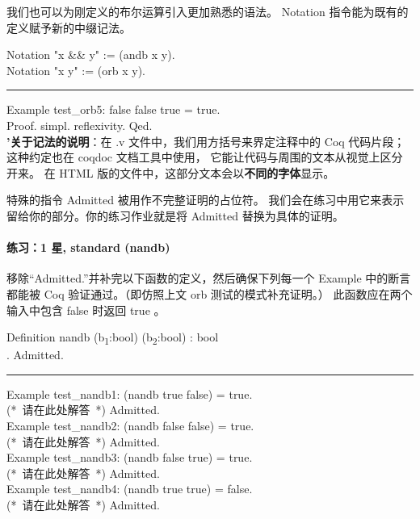 \documentclass[utf8]{ctexart}
\let\oldparagraph\paragraph
\renewcommand{\paragraph}[1]{\oldparagraph{#1}\mbox{}}
\begin{document}
我们也可以为刚定义的布尔运算引入更加熟悉的语法。 {{Notation}}
指令能为既有的定义赋予新的中缀记法。

{Notation} "x \&\& y" := ({andb} {x} {y}).\\
{Notation} "x \textbar\textbar{} y" := ({orb} {x} {y}).\\

\begin{center}\rule{0.5\linewidth}{\linethickness}\end{center}

{Example} {test\_orb5}: {false} \textbar\textbar{} {false}
\textbar\textbar{} {true} = {true}.\\
{Proof}. {simpl}. {reflexivity}. {Qed}.\\

\textbf{'关于记法的说明}：在 {.{v}} 文件中，我们用方括号来界定注释中的
Coq 代码片段；这种约定也在 {{coqdoc}} 文档工具中使用，
它能让代码与周围的文本从视觉上区分开来。 在 HTML
版的文件中，这部分文本会以\textbf{不同的字体}显示。

特殊的指令 {{Admitted}} 被用作不完整证明的占位符。
我们会在练习中用它来表示留给你的部分。你的练习作业就是将 {{Admitted}}
替换为具体的证明。

\protect\hypertarget{lab24}{}{}

\hypertarget{ux7ec3ux4e601-ux661f-standard-nandb}{%
\paragraph{练习：1 星, standard
(nandb)}\label{ux7ec3ux4e601-ux661f-standard-nandb}}

移除``{{Admitted}.}''并补完以下函数的定义，然后确保下列每一个
{{Example}} 中的断言都能被 Coq 验证通过。（即仿照上文 {{orb}}
测试的模式补充证明。） 此函数应在两个输入中包含 {{false}} 时返回
{{true}} 。

{Definition} {nandb} ({b\textsubscript{1}}:{bool})
({b\textsubscript{2}}:{bool}) : {bool}\\
\hspace*{0.333em}\hspace*{0.333em}{(*~将本行替换成~":=~\_你的\_定义\_~."~*)}.
{Admitted}.\\

\begin{center}\rule{0.5\linewidth}{\linethickness}\end{center}

{Example} {test\_nandb1}: ({nandb} {true} {false}) = {true}.\\
{(*~请在此处解答~*)} {Admitted}.\\
{Example} {test\_nandb2}: ({nandb} {false} {false}) = {true}.\\
{(*~请在此处解答~*)} {Admitted}.\\
{Example} {test\_nandb3}: ({nandb} {false} {true}) = {true}.\\
{(*~请在此处解答~*)} {Admitted}.\\
{Example} {test\_nandb4}: ({nandb} {true} {true}) = {false}.\\
{(*~请在此处解答~*)} {Admitted}.\\
\end{document}
